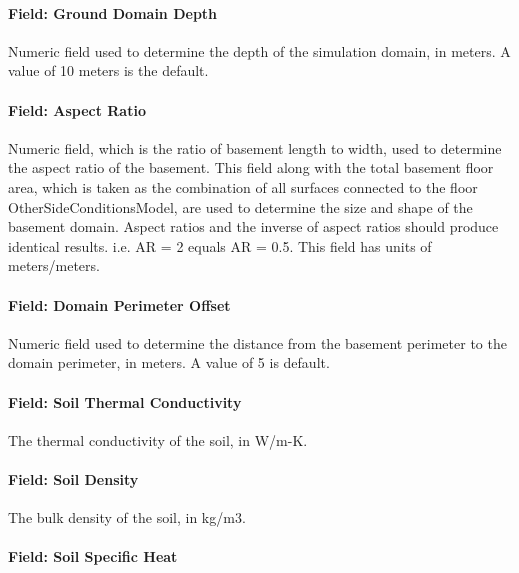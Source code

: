 \paragraph{Field: Ground Domain Depth}\label{field-ground-domain-depth-1}

Numeric field used to determine the depth of the simulation domain, in meters. A value of 10 meters is the default.

\paragraph{Field: Aspect Ratio}\label{field-aspect-ratio-1}

Numeric field, which is the ratio of basement length to width, used to determine the aspect ratio of the basement. This field along with the total basement floor area, which is taken as the combination of all surfaces connected to the floor OtherSideConditionsModel, are used to determine the size and shape of the basement domain. Aspect ratios and the inverse of aspect ratios should produce identical results. i.e. AR = 2 equals AR = 0.5. This field has units of meters/meters.

\paragraph{Field: Domain Perimeter Offset}\label{field-domain-perimeter-offset}

Numeric field used to determine the distance from the basement perimeter to the domain perimeter, in meters. A value of 5 is default.

\paragraph{Field: Soil Thermal Conductivity}\label{field-soil-thermal-conductivity-4}

The thermal conductivity of the soil, in W/m-K.

\paragraph{Field: Soil Density}\label{field-soil-density-4}

The bulk density of the soil, in kg/m3.

\paragraph{Field: Soil Specific Heat}\label{field-soil-specific-heat-4}

